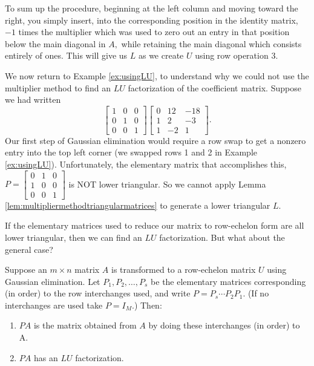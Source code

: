 \documentclass{ximera}
\begin{document}
To sum up the procedure, beginning at the left column and moving toward the right, you
simply insert, into the corresponding position in the identity matrix, $-1$
times the multiplier which was used to zero out an entry in that position
below the main diagonal in $A,$ while retaining the main diagonal which
consists entirely of ones. This will give us $L$ as we create $U$ using row operation 3.

We now return to Example \ref{ex:usingLU}, to understand why we could not use the multiplier method to find an $LU$ factorization of the coefficient matrix.  Suppose we had written 
$$\begin{bmatrix}1&0&0\\0&1&0\\0&0&1\end{bmatrix}\begin{bmatrix}0&12&-18\\1&2&-3\\1&-2&1\end{bmatrix}.$$
Our first step of Gaussian elimination would require a row swap to get a nonzero entry into the top left corner (we swapped rows 1 and 2 in Example \ref{ex:usingLU}).  Unfortunately, the elementary matrix that accomplishes this, $P=\begin{bmatrix}0&1&0\\1&0&0\\0&0&1\end{bmatrix}$ is NOT lower triangular.  So we cannot apply Lemma \ref{lem:multipliermethodtriangularmatrices} to generate a lower triangular $L$.

If the elementary matrices used to reduce our matrix to row-echelon form are all lower triangular, then we can find an $LU$ factorization.  But what about the general case?

\begin{theorem}\label{th:LUPA}
Suppose an $m \times n$ matrix $A$ is transformed to a row-echelon matrix $U$ using Gaussian elimination. Let $P_1, P_2, \ldots, P_s$ be the elementary matrices corresponding (in order) to the row interchanges used,
and write $P=P_s \cdots P_2 P_1$. (If no interchanges are used take $P = I_M$.) Then:
\begin{enumerate}
\item $PA$ is the matrix obtained from $A$ by doing these interchanges (in order) to A.
\item $PA$ has an $LU$ factorization.
\end{enumerate}
\end{theorem}
\end{document}
